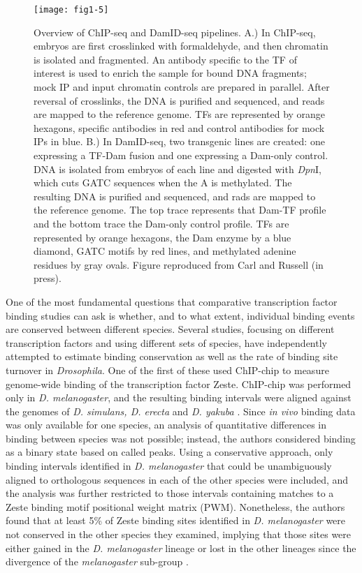 \begin{figure}
\centering
\texttt{[image: fig1-5]}
\caption[Overview of ChIP-seq and DamID-seq pipelines]{Overview of ChIP-seq and DamID-seq pipelines. A.) In ChIP-seq, embryos are first crosslinked with formaldehyde, and then chromatin is isolated and fragmented. An antibody specific to the TF of interest is used to enrich the sample for bound DNA fragments; mock IP and input chromatin controls are prepared in parallel. After reversal of crosslinks, the DNA is purified and sequenced, and reads are mapped to the reference genome. TFs are represented by orange hexagons, specific antibodies in red and control antibodies for mock IPs in blue. B.) In DamID-seq, two transgenic lines are created: one expressing a TF-Dam fusion and one expressing a Dam-only control. DNA is isolated from embryos of each line and digested with \emph{Dpn}I, which cuts GATC sequences when the A is methylated. The resulting DNA is purified and sequenced, and rads are mapped to the reference genome. The top trace represents that Dam-TF profile and the bottom trace the Dam-only control profile. TFs are represented by orange hexagons, the Dam enzyme by a blue diamond, GATC motifs by red lines, and methylated adenine residues by gray ovals. Figure reproduced from Carl and Russell (in press).}
\label{Figure 1.5}
\end{figure}

One of the most fundamental questions that comparative transcription factor binding studies can ask is whether, and to what extent, individual binding events are conserved between different species. Several studies, focusing on different transcription factors and using different sets of species, have independently attempted to estimate binding conservation as well as the rate of binding site turnover in \emph{Drosophila}. One of the first of these used ChIP-chip to measure genome-wide binding of the transcription factor Zeste. ChIP-chip was performed only in \emph{D. melanogaster}, and the resulting binding intervals were aligned against the genomes of \emph{D. simulans, D. erecta} and \emph{D. yakuba} \citep{moses_large-scale_2006}. Since \emph{in vivo} binding data was only available for one species, an analysis of quantitative differences in binding between species was not possible; instead, the authors considered binding as a binary state based on called peaks. Using a conservative approach, only binding intervals identified in \emph{D. melanogaster} that could be unambiguously aligned to orthologous sequences in each of the other species were included, and the analysis was further restricted to those intervals containing matches to a Zeste binding motif positional weight matrix (PWM). Nonetheless, the authors found that at least 5\% of Zeste binding sites identified in \emph{D. melanogaster} were not conserved in the other species they examined, implying that those sites were either gained in the \emph{D. melanogaster} lineage or lost in the other lineages since the divergence of the \emph{melanogaster} sub-group \citep{moses_large-scale_2006}.

